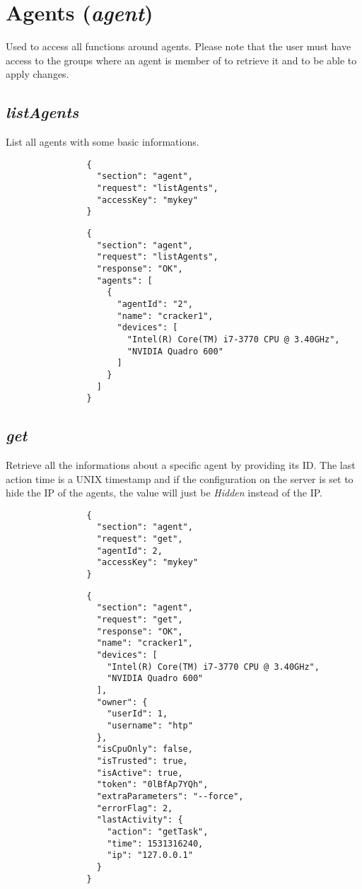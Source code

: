 	\section*{Agents (\textit{agent})}
		Used to access all functions around agents. Please note that the user must have access to the groups where an agent is member of to retrieve it and to be able to apply changes.
		\subsection*{\textit{listAgents}}
			List all agents with some basic informations.
			{
				\color{blue}
				\begin{verbatim}
				{
				  "section": "agent",
				  "request": "listAgents",
				  "accessKey": "mykey"
				}
				\end{verbatim}
			}
			{
				\color{OliveGreen}
				\begin{verbatim}
				{
				  "section": "agent",
				  "request": "listAgents",
				  "response": "OK",
				  "agents": [
				    {
				      "agentId": "2",
				      "name": "cracker1",
				      "devices": [
				        "Intel(R) Core(TM) i7-3770 CPU @ 3.40GHz",
				        "NVIDIA Quadro 600"
				      ]
				    }
				  ]
				}
				\end{verbatim}
			}
		\subsection*{\textit{get}}
			Retrieve all the informations about a specific agent by providing its ID. The last action time is a UNIX timestamp and if the configuration on the server is set to hide the IP of the agents, the value will just be \textit{Hidden} instead of the IP.
			{
				\color{blue}
				\begin{verbatim}
				{
				  "section": "agent",
				  "request": "get",
				  "agentId": 2,
				  "accessKey": "mykey"
				}
				\end{verbatim}
			}
			{
				\color{OliveGreen}
				\begin{verbatim}
				{
				  "section": "agent",
				  "request": "get",
				  "response": "OK",
				  "name": "cracker1",
				  "devices": [
				    "Intel(R) Core(TM) i7-3770 CPU @ 3.40GHz",
				    "NVIDIA Quadro 600"
				  ],
				  "owner": {
				    "userId": 1,
				    "username": "htp"
				  },
				  "isCpuOnly": false,
				  "isTrusted": true,
				  "isActive": true,
				  "token": "0lBfAp7YQh",
				  "extraParameters": "--force",
				  "errorFlag": 2,
				  "lastActivity": {
				    "action": "getTask",
				    "time": 1531316240,
				    "ip": "127.0.0.1"
				  }
				}
				\end{verbatim}
			}

